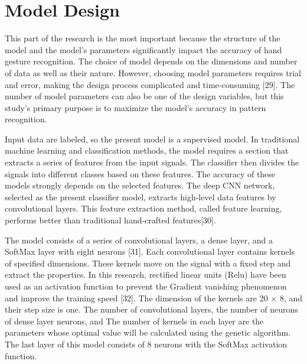 \section{Model Design}
This part of the research is the most important because the structure of the model and the model's parameters significantly impact the accuracy of hand gesture recognition. The choice of model depends on the dimensions and number of data as well as their nature. However, choosing model parameters requires trial and error, making the design process complicated and time-consuming [29]. The number of model parameters can also be one of the design variables, but this study's primary purpose is to maximize the model's accuracy in pattern recognition. 

Input data are labeled, so the present model is a supervised model. In traditional machine learning and classification methods, the model requires a section that extracts a series of features from the input signals. The classifier then divides the signals into different classes based on these features. The accuracy of these models strongly depends on the selected features. The deep CNN network, selected as the present classifier model, extracts high-level data features by convolutional layers. This feature extraction method, called feature learning, performs better than traditional hand-crafted features[30].

The model consists of a series of convolutional layers, a dense layer, and a SoftMax layer with eight neurons [31]. Each convolutional layer contains kernels of specified dimensions. These kernels move on the signal with a fixed step and extract the properties. In this research, rectified linear units (Relu) have been used as an activation function to prevent the Gradient vanishing phenomenon and improve the training speed [32]. The dimension of the kernels are 20 × 8, and their step size is one. The number of convolutional layers, the number of neurons of dense layer neurons, and  The number of kernels in each layer are the parameters whose optimal value will be calculated using the genetic algorithm. The last layer of this model consists of 8 neurons with the SoftMax activation function. 

